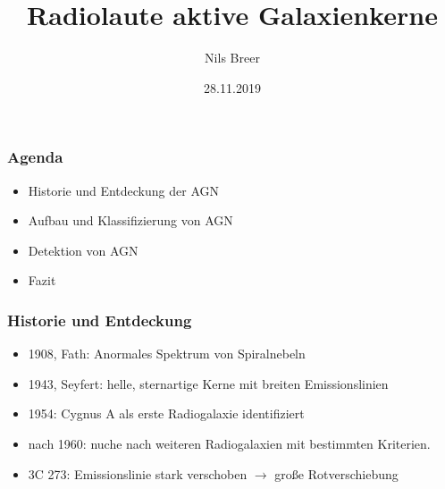 \documentclass[aspectratio=1610, 9pt]{beamer}
\title{Radiolaute aktive Galaxienkerne}
\author[N.Breer]{Nils Breer}
\institute{Fakultät Physik}
\date{28.11.2019}
\begin{document}
\maketitle

\begin{frame}\frametitle{Agenda}
  \begin{itemize}
    \item Historie und Entdeckung der AGN
    \item Aufbau und Klassifizierung von AGN
    \item Detektion von AGN
    \item Fazit
  \end{itemize}
\end{frame}

\begin{frame}\frametitle{Historie und Entdeckung}
  \begin{itemize}
    \item 1908, Fath: Anormales Spektrum von Spiralnebeln
    \item 1943, Seyfert: helle, sternartige Kerne mit breiten Emissionslinien
    \item 1954: Cygnus A als erste Radiogalaxie identifiziert
    \item nach 1960: nuche nach weiteren Radiogalaxien mit bestimmten Kriterien.
    \item 3C 273: Emissionslinie stark verschoben $\to$ gro\ss e Rotverschiebung
  \end{itemize}
\end{frame}

\end{document}
